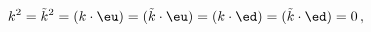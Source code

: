 \begin{equation}
k^2={\tilde k}^2=(k\cdot\eu)=(\tilde k\cdot \eu)=(k\cdot\ed)=(\tilde
k\cdot\ed)=0\,,
\end{equation}

